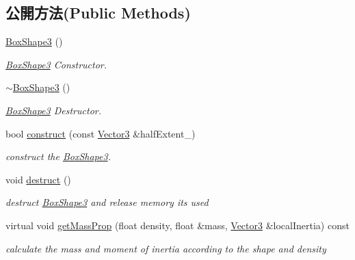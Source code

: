 \subsection*{公開方法(Public Methods)}
\begin{DoxyCompactItemize}
\item 
\hyperlink{class_magnum_1_1_box_shape3_a137fc4277ec6c9a2a87f1f919d8e831d}{Box\+Shape3} ()
\begin{DoxyCompactList}\small\item\em \hyperlink{class_magnum_1_1_box_shape3}{Box\+Shape3} Constructor. \end{DoxyCompactList}\item 
\hyperlink{class_magnum_1_1_box_shape3_a9c44670d3cc33ae3c0aa8d8c12495a96}{$\sim$\+Box\+Shape3} ()
\begin{DoxyCompactList}\small\item\em \hyperlink{class_magnum_1_1_box_shape3}{Box\+Shape3} Destructor. \end{DoxyCompactList}\item 
bool \hyperlink{class_magnum_1_1_box_shape3_afcb880918c47623a4487a353b3ee6de9}{construct} (const \hyperlink{class_magnum_1_1_vector3}{Vector3} \&half\+Extent\+\_\+)
\begin{DoxyCompactList}\small\item\em construct the \hyperlink{class_magnum_1_1_box_shape3}{Box\+Shape3}. \end{DoxyCompactList}\item 
void \hyperlink{class_magnum_1_1_box_shape3_a647ee110dbb44329caf171b7e9aed417}{destruct} ()\hypertarget{class_magnum_1_1_box_shape3_a647ee110dbb44329caf171b7e9aed417}{}\label{class_magnum_1_1_box_shape3_a647ee110dbb44329caf171b7e9aed417}

\begin{DoxyCompactList}\small\item\em destruct \hyperlink{class_magnum_1_1_box_shape3}{Box\+Shape3} and release memory its used \end{DoxyCompactList}\item 
virtual void \hyperlink{class_magnum_1_1_box_shape3_aeb4314532f69b7e03d98dacd2f374095}{get\+Mass\+Prop} (float density, float \&mass, \hyperlink{class_magnum_1_1_vector3}{Vector3} \&local\+Inertia) const 
\begin{DoxyCompactList}\small\item\em calculate the mass and moment of inertia according to the shape and density \end{DoxyCompactList}\end{DoxyCompactItemize}
